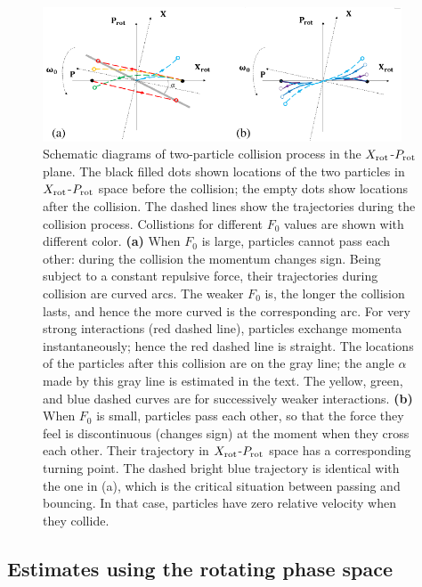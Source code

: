 \documentclass[a4paper, onecolumn]{revtex4-1}
\begin{document}
\begin{figure}[tbph]
\includegraphics[width=0.95\textwidth]{phase-space_collisioncartoons_01.pdf}
\caption{Schematic diagrams of two-particle collision process in the $X_{\rm rot}$-$P_{\rm rot}$
  plane. 
%
The black filled dots shown locations of the two particles in $X_{\rm rot}$-$P_{\rm rot}$ space
before the collision; the empty dots show locations after the collision.  The dashed lines show the
trajectories during the collision process.  Collistions for different $F_0$ values are shown with
different color.
%
\textbf{(a)} When $F_0$ is large, particles cannot pass each other: during the collision the
momentum changes sign.  Being subject to a constant repulsive force, their trajectories during
collision are curved arcs.  The weaker $F_0$ is, the longer the collision lasts, and hence the more
curved is the corresponding arc.
%
For very strong interactions (red dashed line), particles exchange momenta instantaneously; hence
the red dashed line is straight.  The locations of the particles after this collision are on the
gray line; the angle $\alpha$ made by this gray line is estimated in the text.  The yellow, green,
and blue dashed curves are for successively weaker interactions.  \textbf{(b)} When $F_0$ is small,
particles pass each other, so that the force they feel is discontinuous (changes sign) at the moment
when they cross each other.  Their trajectory in $X_{\rm rot}$-$P_{\rm rot}$ space has a
corresponding turning point.  The dashed bright blue trajectory is identical with the one in (a),
which is the critical situation between passing and bouncing. In that case, particles have zero
relative velocity when they collide. }
\label{fig:Breathingfrequency3}
\end{figure}


\subsection{Estimates using the rotating phase space}
\end{document}
